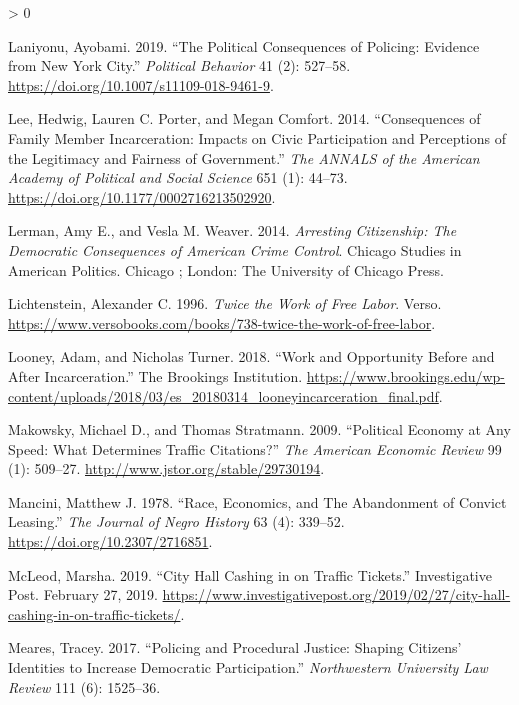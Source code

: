 \documentclass[
  12pt,
]{article}
\newlength{\cslhangindent}
\newenvironment{CSLReferences}[2] %
 {%
  \setlength{\parindent}{0pt}
  \ifodd #1 \everypar{\setlength{\hangindent}{\cslhangindent}}\ignorespaces\fi
  \ifnum #2 > 0
  \setlength{\parskip}{#2\baselineskip}
  \fi
 }%
 {}
\begin{document}
\begin{CSLReferences}{1}{0}
\leavevmode\hypertarget{ref-Laniyonu2019}{}%
Laniyonu, Ayobami. 2019. {``The {Political Consequences} of {Policing}: {Evidence} from {New York City}.''} \emph{Political Behavior} 41 (2): 527--58. \url{https://doi.org/10.1007/s11109-018-9461-9}.

\leavevmode\hypertarget{ref-Lee2014}{}%
Lee, Hedwig, Lauren C. Porter, and Megan Comfort. 2014. {``Consequences of {Family Member Incarceration}: {Impacts} on {Civic Participation} and {Perceptions} of the {Legitimacy} and {Fairness} of {Government}.''} \emph{The ANNALS of the American Academy of Political and Social Science} 651 (1): 44--73. \url{https://doi.org/10.1177/0002716213502920}.

\leavevmode\hypertarget{ref-Lerman2014}{}%
Lerman, Amy E., and Vesla M. Weaver. 2014. \emph{Arresting Citizenship: The Democratic Consequences of {American} Crime Control}. Chicago Studies in {American} Politics. {Chicago ; London}: {The University of Chicago Press}.

\leavevmode\hypertarget{ref-Lichtenstein1996}{}%
Lichtenstein, Alexander C. 1996. \emph{Twice the {Work} of {Free Labor}}. {Verso}. \url{https://www.versobooks.com/books/738-twice-the-work-of-free-labor}.

\leavevmode\hypertarget{ref-Looney2018}{}%
Looney, Adam, and Nicholas Turner. 2018. {``Work and Opportunity Before and After Incarceration.''} {The Brookings Institution}. \url{https://www.brookings.edu/wp-content/uploads/2018/03/es_20180314_looneyincarceration_final.pdf}.

\leavevmode\hypertarget{ref-Makowsky2009}{}%
Makowsky, Michael D., and Thomas Stratmann. 2009. {``Political {Economy} at {Any Speed}: {What Determines Traffic Citations}?''} \emph{The American Economic Review} 99 (1): 509--27. \url{http://www.jstor.org/stable/29730194}.

\leavevmode\hypertarget{ref-Mancini1978}{}%
Mancini, Matthew J. 1978. {``Race, {Economics}, and {The Abandonment} of {Convict Leasing}.''} \emph{The Journal of Negro History} 63 (4): 339--52. \url{https://doi.org/10.2307/2716851}.

\leavevmode\hypertarget{ref-McLeod2019}{}%
McLeod, Marsha. 2019. {``City {Hall} Cashing in on Traffic Tickets.''} {Investigative Post}. February 27, 2019. \url{https://www.investigativepost.org/2019/02/27/city-hall-cashing-in-on-traffic-tickets/}.

\leavevmode\hypertarget{ref-Meares2017}{}%
Meares, Tracey. 2017. {``Policing and {Procedural Justice}: {Shaping Citizens}' {Identities} to {Increase Democratic Participation}.''} \emph{Northwestern University Law Review} 111 (6): 1525--36.


\end{CSLReferences}
\end{document}
